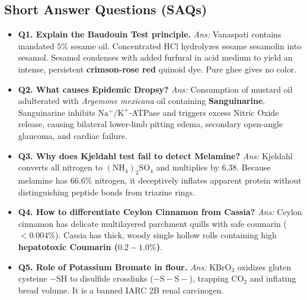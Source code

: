 \documentclass[10pt,a4paper,oneside]{article}
\begin{document}
\subsection{Short Answer Questions (SAQs)}
\begin{itemize}[leftmargin=*]
    \item \textbf{Q1. Explain the Baudouin Test principle.}  
    \textit{Ans:} Vanaspati contains mandated $5\%$ sesame oil. Concentrated $\mathrm{HCl}$ hydrolyzes sesame sesamolin into sesamol. Sesamol condenses with added furfural in acid medium to yield an intense, persistent \textbf{crimson-rose red} quinoid dye. Pure ghee gives no color.
    \item \textbf{Q2. What causes Epidemic Dropsy?}  
    \textit{Ans:} Consumption of mustard oil adulterated with \textit{Argemone mexicana} oil containing \textbf{Sanguinarine}. Sanguinarine inhibits $\mathrm{Na^+/K^+}$-ATPase and triggers excess Nitric Oxide release, causing bilateral lower-limb pitting edema, secondary open-angle glaucoma, and cardiac failure.
    \item \textbf{Q3. Why does Kjeldahl test fail to detect Melamine?}  
    \textit{Ans:} Kjeldahl converts all nitrogen to $(\mathrm{NH_4})_2\mathrm{SO_4}$ and multiplies by $6.38$. Because melamine has $66.6\%$ nitrogen, it deceptively inflates apparent protein without distinguishing peptide bonds from triazine rings.
    \item \textbf{Q4. How to differentiate Ceylon Cinnamon from Cassia?}  
    \textit{Ans:} Ceylon cinnamon has delicate multilayered parchment quills with safe coumarin ($<0.004\%$). Cassia has thick, woody single hollow rolls containing high \textbf{hepatotoxic Coumarin ($0.2-1.0\%$)}.
    \item \textbf{Q5. Role of Potassium Bromate in flour.}  
    \textit{Ans:} $\mathrm{KBrO_3}$ oxidizes gluten cysteine $-\mathrm{SH}$ to disulfide crosslinks ($-\mathrm{S-S-}$), trapping $\mathrm{CO_2}$ and inflating bread volume. It is a banned IARC 2B renal carcinogen.
\end{itemize}
\end{document}
